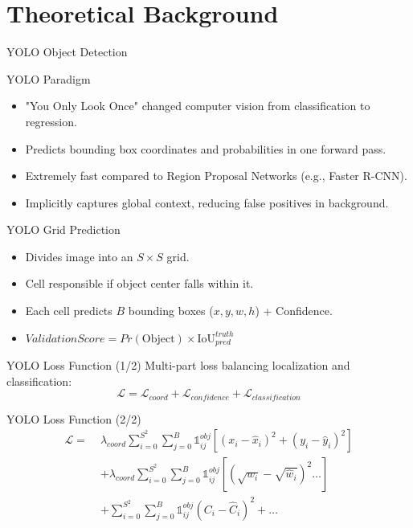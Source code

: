 \documentclass{beamer}
\begin{document}
\section{Theoretical Background}

\begin{frame}
    \centering
    \Huge YOLO Object Detection
\end{frame}

\begin{frame}{YOLO Paradigm}
\begin{itemize}
    \item "You Only Look Once" changed computer vision from classification to regression.
    \item Predicts bounding box coordinates and probabilities in one forward pass.
    \item Extremely fast compared to Region Proposal Networks (e.g., Faster R-CNN).
    \item Implicitly captures global context, reducing false positives in background.
\end{itemize}
\end{frame}

\begin{frame}{YOLO Grid Prediction}
\begin{itemize}
    \item Divides image into an $S \times S$ grid.
    \item Cell responsible if object center falls within it.
    \item Each cell predicts $B$ bounding boxes ($x,y,w,h$) + Confidence.
    \item $Validation Score = Pr(\text{Object}) \times \text{IoU}_{pred}^{truth}$
\end{itemize}
\end{frame}

\begin{frame}{YOLO Loss Function (1/2)}
Multi-part loss balancing localization and classification:
\begin{equation}
    \mathcal{L} = \mathcal{L}_{coord} + \mathcal{L}_{confidence} + \mathcal{L}_{classification}
\end{equation}
\end{frame}

\begin{frame}{YOLO Loss Function (2/2)}
\begin{equation}
\begin{aligned}
    \mathcal{L} = \;&\lambda_{coord} \sum_{i=0}^{S^2} \sum_{j=0}^{B} \mathbb{1}_{ij}^{obj} \left[ (x_i - \hat{x}_i)^2 + (y_i - \hat{y}_i)^2 \right] \\
    &+ \lambda_{coord} \sum_{i=0}^{S^2} \sum_{j=0}^{B} \mathbb{1}_{ij}^{obj} \left[ (\sqrt{w_i} - \sqrt{\hat{w}_i})^2 \dots \right] \\
    &+ \sum_{i=0}^{S^2} \sum_{j=0}^{B} \mathbb{1}_{ij}^{obj} (C_i - \hat{C}_i)^2 + \dots
\end{aligned}
\end{equation}
\end{frame}
\end{document}
